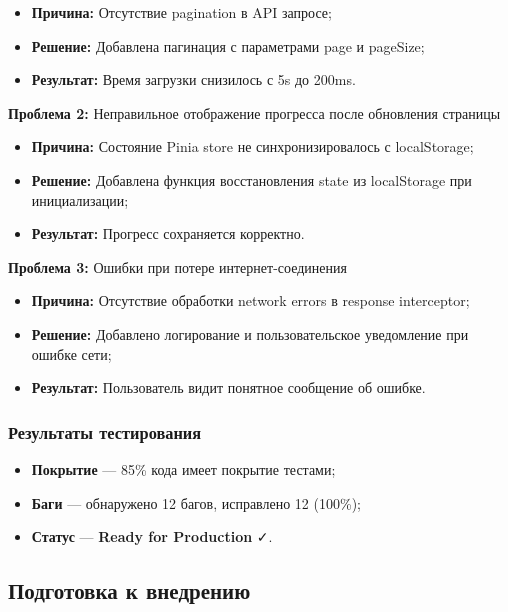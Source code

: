 \begin{itemize}
    \item \textbf{Причина:} Отсутствие pagination в API запросе;
    \item \textbf{Решение:} Добавлена пагинация с параметрами page и pageSize;
    \item \textbf{Результат:} Время загрузки снизилось с 5s до 200ms.
\end{itemize}

\textbf{Проблема 2:} Неправильное отображение прогресса после обновления страницы

\begin{itemize}
    \item \textbf{Причина:} Состояние Pinia store не синхронизировалось с localStorage;
    \item \textbf{Решение:} Добавлена функция восстановления state из localStorage при инициализации;
    \item \textbf{Результат:} Прогресс сохраняется корректно.
\end{itemize}

\textbf{Проблема 3:} Ошибки при потере интернет-соединения

\begin{itemize}
    \item \textbf{Причина:} Отсутствие обработки network errors в response interceptor;
    \item \textbf{Решение:} Добавлено логирование и пользовательское уведомление при ошибке сети;
    \item \textbf{Результат:} Пользователь видит понятное сообщение об ошибке.
\end{itemize}

\subsubsection{Результаты тестирования}

\begin{itemize}
    \item \textbf{Покрытие} --- 85\% кода имеет покрытие тестами;
    \item \textbf{Баги} --- обнаружено 12 багов, исправлено 12 (100\%);
    \item \textbf{Статус} --- \textbf{Ready for Production} ✓.
\end{itemize}


\subsection{Подготовка к внедрению}

